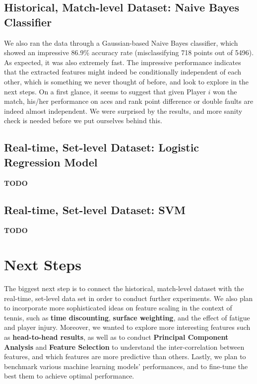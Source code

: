 \documentclass[paper=a4, fontsize=11pt]{scrartcl} %
\numberwithin{equation}{section} %
\numberwithin{figure}{section} %
\numberwithin{table}{section} %
\begin{document}
\subsection{Historical, Match-level Dataset: Naive Bayes Classifier}
We also ran the data through a Gaussian-based Naive Bayes classifier, which showed an impressive 86.9\% accuracy rate (misclassifying 718 points out of 5496). As expected, it was also extremely fast. The impressive performance indicates that the extracted features might indeed be conditionally independent of each other, which is something we never thought of before, and look to explore in the next steps. On a first glance, it seems to suggest that given Player $i$ won the match, his/her performance on aces and rank point difference or double faults are indeed almost independent. We were surprised by the results, and more sanity check is needed before we put ourselves behind this. 
\subsection{Real-time, Set-level Dataset: Logistic Regression Model}
\textbf{TODO}
\subsection{Real-time, Set-level Dataset:  SVM}
\textbf{TODO}


\section{Next Steps}
The biggest next step is to connect the historical, match-level dataset with the real-time, set-level data set in order to conduct further experiments. We also plan to incorporate more sophisticated ideas on feature scaling in the context of tennis, such as \textbf{time discounting}, \textbf{surface weighting}, and the effect of fatigue and player injury. Moreover, we wanted to explore more interesting features such as \textbf{head-to-head results}, as well as to conduct \textbf{Principal Component Analysis} and \textbf{Feature Selection} to understand the inter-correlation between features, and which features are more predictive than others. Lastly, we plan to benchmark various machine learning models' performances, and to fine-tune the best them to achieve optimal performance. 
\end{document}
